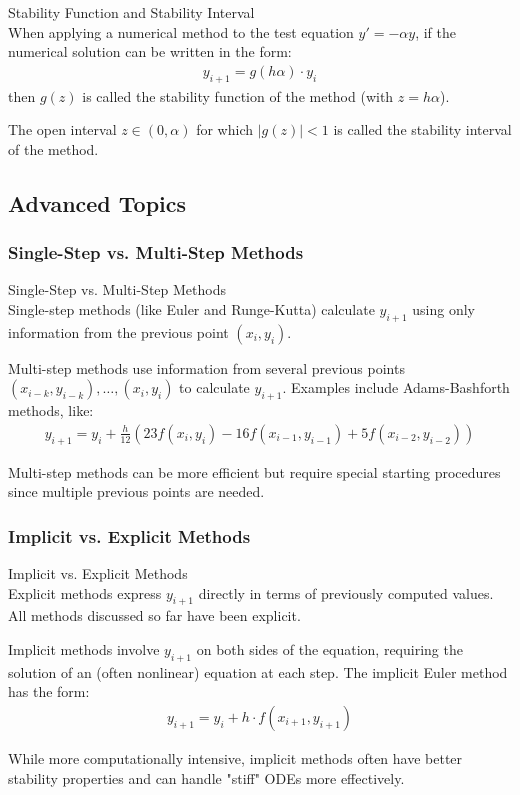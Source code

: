 \begin{definition}{Stability Function and Stability Interval}\\
When applying a numerical method to the test equation $y' = -\alpha y$, if the numerical solution can be written in the form:
\begin{align*}
y_{i+1} = g(h\alpha) \cdot y_i
\end{align*}
then $g(z)$ is called the stability function of the method (with $z = h\alpha$).

The open interval $z \in (0, \alpha)$ for which $|g(z)| < 1$ is called the stability interval of the method.
\end{definition}

\subsection{Advanced Topics}

\subsubsection{Single-Step vs. Multi-Step Methods}

\begin{concept}{Single-Step vs. Multi-Step Methods}\\
Single-step methods (like Euler and Runge-Kutta) calculate $y_{i+1}$ using only information from the previous point $(x_i, y_i)$.

Multi-step methods use information from several previous points $(x_{i-k}, y_{i-k}), \ldots, (x_i, y_i)$ to calculate $y_{i+1}$. Examples include Adams-Bashforth methods, like:
\begin{align*}
y_{i+1} = y_i + \frac{h}{12}(23f(x_i, y_i) - 16f(x_{i-1}, y_{i-1}) + 5f(x_{i-2}, y_{i-2}))
\end{align*}

Multi-step methods can be more efficient but require special starting procedures since multiple previous points are needed.
\end{concept}

\subsubsection{Implicit vs. Explicit Methods}

\begin{concept}{Implicit vs. Explicit Methods}\\
Explicit methods express $y_{i+1}$ directly in terms of previously computed values. All methods discussed so far have been explicit.

Implicit methods involve $y_{i+1}$ on both sides of the equation, requiring the solution of an (often nonlinear) equation at each step. The implicit Euler method has the form:
\begin{align*}
y_{i+1} = y_i + h \cdot f(x_{i+1}, y_{i+1})
\end{align*}

While more computationally intensive, implicit methods often have better stability properties and can handle "stiff" ODEs more effectively.
\end{concept}

